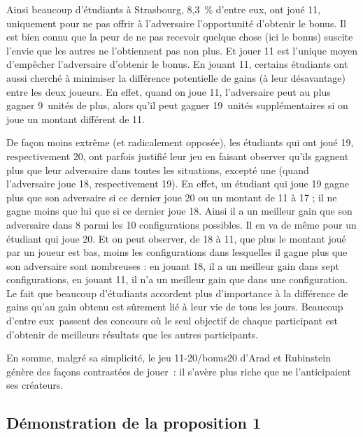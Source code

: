 \begin{Article}
\begin{refsection}[UmbhauerFR]
Ainsi beaucoup d'étudiants à Strasbourg, 8,3~\% d'entre eux, ont joué 11,
uniquement pour ne pas offrir à l'adversaire l'opportunité d'obtenir le
bonus. Il est bien connu que la peur de ne pas recevoir quelque chose
(ici le bonus) suscite l'envie que les autres ne l'obtiennent pas non
plus. Et jouer 11 est l'unique moyen d'empêcher l'adversaire d'obtenir
le bonus. En jouant 11, certains étudiants ont aussi cherché à minimiser
la différence potentielle de gains (à leur désavantage) entre les deux
joueurs. En effet, quand on joue 11, l'adversaire peut au plus gagner 9~unités de plus, alors qu'il peut gagner 19~unités supplémentaires si on
joue un montant différent de 11.

De façon moins extrême (et radicalement opposée), les étudiants qui ont
joué 19, respectivement 20, ont parfois justifié leur jeu en faisant
observer qu'ils gagnent plus que leur adversaire dans toutes les
situations, excepté une (quand l'adversaire joue 18, respectivement 19).
En effet, un étudiant qui joue 19 gagne plus que son adversaire si ce
dernier joue 20 ou un montant de 11 à 17 ; il ne gagne moins que lui que
si ce dernier joue 18. Ainsi il a un meilleur gain que son adversaire
dans 8 parmi les 10 configurations possibles. Il en va de même pour un
étudiant qui joue 20. Et on peut observer, de 18 à 11, que plus le
montant joué par un joueur est bas, moins les
configurations dans lesquelles il gagne plus que son adversaire sont nombreuses : en
jouant 18, il a un meilleur gain dans sept configurations, en jouant 11, il
n'a un meilleur gain que dans une configuration. Le fait que beaucoup
d'étudiants accordent plus d'importance à la différence de gains qu'au
gain obtenu est sûrement lié à leur vie de tous les jours. Beaucoup
d'entre eux~passent des concours où le seul objectif de chaque
participant est d'obtenir de meilleurs résultats que les autres
participants.

En somme, malgré sa simplicité, le jeu 11-20/bonus20 d'Arad et Rubinstein génère des façons contrastées de jouer~: il s'avère plus riche que ne l'anticipaient ses créateurs.

\printbibliography

\clearpage

\begin{appendices}
  
\section{Démonstration de la proposition 1}
\label{Annexe:Démonstration prop 1_Umbhauer}


\end{appendices}
\end{refsection}
\end{Article}
